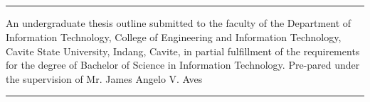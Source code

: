 \begin{center}
	\textbf{\thesistitle{}}

	\leavevmode\\
	\leavevmode\\

	\thesisautors{}

	\leavevmode\\
	\leavevmode\\

	\hrule
	\parbox{\textwidth}{
	\justify
	An undergraduate thesis outline submitted to the faculty of the Department of Information
	Technology, College of Engineering and Information Technology, Cavite State University,
	Indang, Cavite, in partial fulfillment of the requirements for the degree of Bachelor of
	Science in Information Technology. Pre-pared under the supervision of Mr. James Angelo V. Aves}
	\hrule

	\leavevmode\\
	\leavevmode\\
\end{center}
